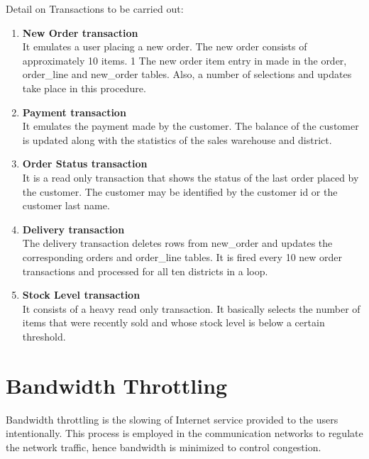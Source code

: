 \documentclass[12pt]{book}
\begin{document}
Detail on Transactions to be carried out\cite{Tpcc}\cite{Standard}:
 \begin{enumerate}
  \item \textbf{New Order transaction} \\
  It emulates a user placing a new order. The new order consists of approximately 10 items.
  1%
  The new order item entry in made in the order, order\_line and new\_order tables.
  Also, a number of selections and updates take place in this procedure. \\

  \item \textbf{Payment transaction} \\
   It emulates the payment made by the customer. The balance of the customer is updated along with the statistics of the sales warehouse and district.\\ 
  
  \item \textbf{Order Status transaction} \\
  It is a read only transaction that shows the status of the last order placed by the customer. The customer may be identified by the customer id or the customer last name.\\
  \item \textbf{Delivery transaction} \\
    The delivery transaction deletes rows from new\_order and updates the corresponding orders and order\_line tables.
	It is fired every 10 new order transactions and processed for all ten districts in a loop.\\ 
  \item \textbf{Stock Level transaction} \\
  It consists of a heavy read only transaction.
  It basically selects the number of items that were recently sold and whose stock level is below a certain threshold.\\
 \end{enumerate}
 
\section{Bandwidth Throttling}
Bandwidth throttling is the slowing of Internet service provided to the users intentionally. This process is
employed in the communication networks to regulate the network traffic, hence bandwidth is minimized to control congestion.\\
\end{document}
